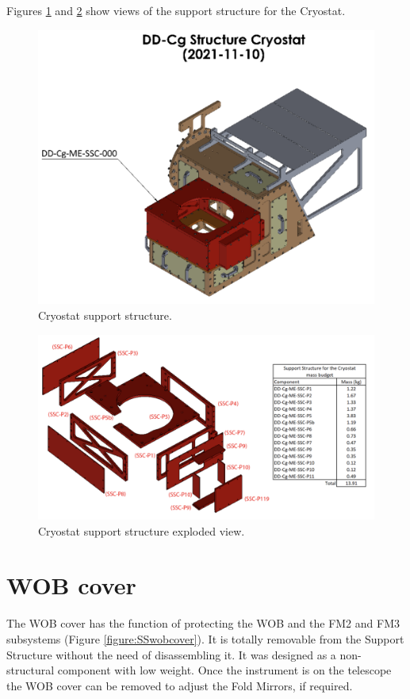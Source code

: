 \documentclass{report}
\begin{document}
Figures \ref{figure:SScryo} and \ref{figure:SScryoexploded} show views of the support structure for the Cryostat.

\begin{figure}
\centering
\includegraphics[width=0.7\linewidth]{figures/SScryo.png}
\caption{Cryostat support structure.}
\label{figure:SScryo}
\end{figure}


\begin{figure}
\centering
\includegraphics[width=0.8\linewidth]{figures/SScryoexploded.png}
\caption{Cryostat support structure exploded view.}
\label{figure:SScryoexploded}
\end{figure}

\section{WOB cover}

The WOB cover has the function of protecting the WOB and the FM2 and FM3 subsystems (Figure \ref{figure:SSwobcover}). It is totally removable from the Support Structure without the need of disassembling it. It was designed as a non-structural component with low weight. Once the instrument is on the telescope the WOB cover can be removed to adjust the Fold Mirrors, if required.
\end{document}
